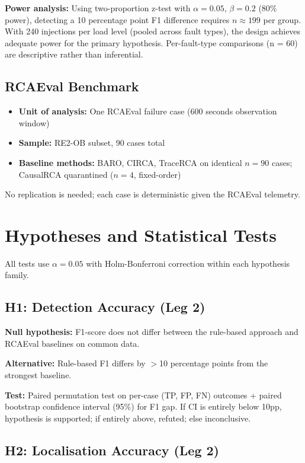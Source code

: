 \textbf{Power analysis:} Using two-proportion z-test with $\alpha = 0.05$, $\beta = 0.2$ (80\% power), detecting a 10 percentage point F1 difference requires $n \approx 199$ per group. With 240 injections per load level (pooled across fault types), the design achieves adequate power for the primary hypothesis. Per-fault-type comparisons (n = 60) are descriptive rather than inferential.

\subsection{RCAEval Benchmark}
\begin{itemize}
    \item \textbf{Unit of analysis:} One RCAEval failure case (600 seconds observation window)
    \item \textbf{Sample:} RE2-OB subset, 90 cases total
    \item \textbf{Baseline methods:} BARO, CIRCA, TraceRCA on identical $n{=}90$ cases; CausalRCA quarantined ($n{=}4$, fixed-order)
\end{itemize}

No replication is needed; each case is deterministic given the RCAEval telemetry.

\section{Hypotheses and Statistical Tests}

All tests use $\alpha = 0.05$ with Holm-Bonferroni correction within each hypothesis family.

\subsection{H1: Detection Accuracy (Leg 2)}

\textbf{Null hypothesis:} F1-score does not differ between the rule-based approach and RCAEval baselines on common data.

\textbf{Alternative:} Rule-based F1 differs by $>$10 percentage points from the strongest baseline.

\textbf{Test:} Paired permutation test on per-case (TP, FP, FN) outcomes + paired bootstrap confidence interval (95\%) for F1 gap. If CI is entirely below 10pp, hypothesis is supported; if entirely above, refuted; else inconclusive.

\subsection{H2: Localisation Accuracy (Leg 2)}

